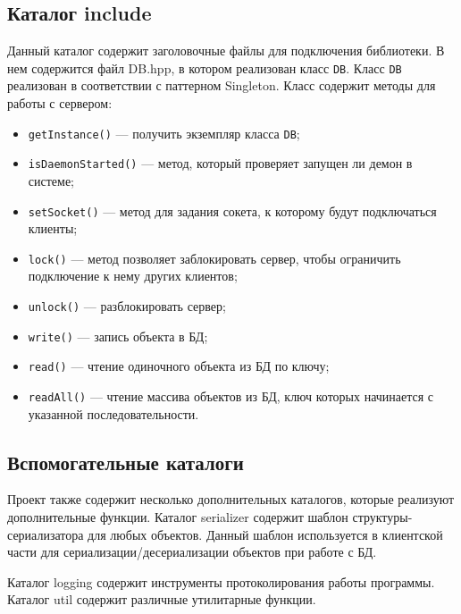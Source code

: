\subsection{Каталог include}
Данный каталог содержит заголовочные файлы для подключения библиотеки. В нем содержится файл DB.hpp, в котором реализован класс \texttt{DB}. Класс \texttt{DB} реализован в соответствии с паттерном Singleton\cite{singleton}. Класс содержит методы для работы с сервером:
\begin{itemize}
\item \texttt{getInstance()} --- получить экземпляр класса \texttt{DB};
\item \texttt{isDaemonStarted()} --- метод, который проверяет запущен ли демон в системе;
\item \texttt{setSocket()} --- метод для задания сокета, к которому будут подключаться клиенты;
\item \texttt{lock()} --- метод позволяет заблокировать сервер, чтобы ограничить подключение к нему других клиентов;
\item \texttt{unlock()} --- разблокировать сервер;
\item \texttt{write()} --- запись объекта в БД;
\item \texttt{read()} --- чтение одиночного объекта из БД по ключу;
\item \texttt{readAll()} --- чтение массива объектов из БД, ключ которых начинается с указанной последовательности.
\end{itemize}


\subsection{Вспомогательные каталоги}
Проект также содержит несколько дополнительных каталогов, которые реализуют дополнительные функции. Каталог serializer содержит шаблон структуры-сериализатора для любых объектов. Данный шаблон используется в клиентской части для сериализации/десериализации объектов при работе с БД.

Каталог logging содержит инструменты протоколирования работы программы. Каталог util содержит различные утилитарные функции.

